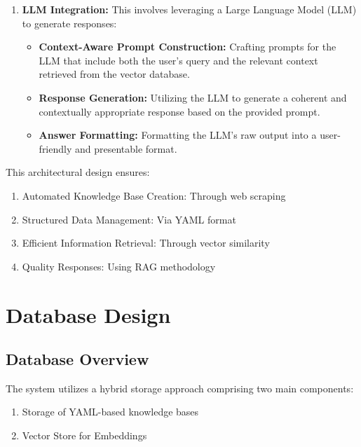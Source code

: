 \documentclass[12pt,a4paper]{report}
\begin{document}
\begin{enumerate}
    \item \textbf{LLM Integration:} This involves leveraging a Large Language Model (LLM) to generate responses:
    \begin{itemize}[label=$\bullet$, leftmargin=*]
        \item \textbf{Context-Aware Prompt Construction:} Crafting prompts for the LLM that include both the user's query and the relevant context retrieved from the vector database.
        \item \textbf{Response Generation:} Utilizing the LLM to generate a coherent and contextually appropriate response based on the provided prompt.
        \item \textbf{Answer Formatting:}  Formatting the LLM's raw output into a user-friendly and presentable format.
    \end{itemize}
\end{enumerate}

This architectural design ensures:
\begin{enumerate}
    \item Automated Knowledge Base Creation: Through web scraping
    \item Structured Data Management: Via YAML format
    \item Efficient Information Retrieval: Through vector similarity
    \item Quality Responses: Using RAG methodology
\end{enumerate}



\section{Database Design}

\subsection{Database Overview}
The system utilizes a hybrid storage approach comprising two main components:
\begin{enumerate}
    \item Storage of YAML-based knowledge bases
    \item  Vector Store for Embeddings
\end{enumerate}
\end{document}
